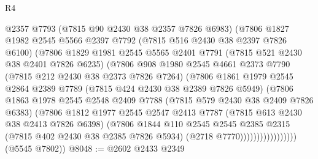 \begin{lexlean}{R4}
\begin{coremodule}
                        @2357
                        @7793
                        (@7815 @90 @2430 @38 @2357 @7826 @6983)
                        (@7806
                          @1827
                          @1982
                          @2545
                          @5566
                          @2397
                          @7792
                          (@7815 @516 @2430 @38 @2397 @7826 @6100)
                          (@7806
                            @1829
                            @1981
                            @2545
                            @5565
                            @2401
                            @7791
                            (@7815 @521 @2430 @38 @2401 @7826 @6235)
                            (@7806
                              @908
                              @1980
                              @2545
                              @4661
                              @2373
                              @7790
                              (@7815 @212 @2430 @38 @2373 @7826 @7264)
                              (@7806
                                @1861
                                @1979
                                @2545
                                @2864
                                @2389
                                @7789
                                (@7815 @424 @2430 @38 @2389 @7826 @5949)
                                (@7806
                                  @1863
                                  @1978
                                  @2545
                                  @2548
                                  @2409
                                  @7788
                                  (@7815 @579 @2430 @38 @2409 @7826 @6383)
                                  (@7806
                                    @1812
                                    @1977
                                    @2545
                                    @2547
                                    @2413
                                    @7787
                                    (@7815 @613 @2430 @38 @2413 @7826 @6398)
                                    (@7806
                                      @1844
                                      @110
                                      @2545
                                      @2545
                                      @2385
                                      @2315
                                      (@7815 @402 @2430 @38 @2385 @7826 @5934)
                                      (@2718 @7770)))))))))))))))))
      (@5545 @7802))
@8048 := @2602 @2433 @2349

\end{coremodule}
\end{lexlean}
